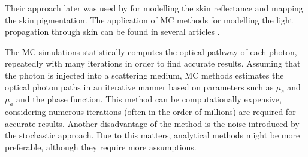 Their approach later was used by \cite{tsumura2001mapping} for modelling the skin reflectance and mapping the skin pigmentation. The application of MC methods for modelling the light propagation through skin can be found in several articles \cite{meglinski2003computer, igarashi2007appearance}.

The MC simulations statistically computes the optical pathway of each photon, repeatedly with many iterations in order to find accurate results. Assuming that the photon is injected into a scattering medium, MC methods estimates the optical photon paths in an iterative manner based on parameters such as $\mu_{s}$ and $\mu_{a}$ and the phase function. This method can be computationally expensive, considering numerous iterations (often in the order of millions) are required for accurate results. Another disadvantage of the method is the noise introduced by the stochastic approach. Due to this matters, analytical methods might be more preferable, although they require more assumptions. 


